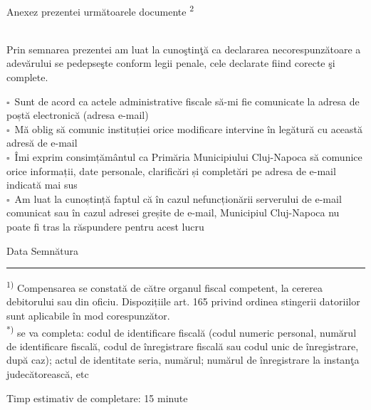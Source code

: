 \documentclass[11pt,a4paper]{article}
\newcommand{\fillline}[1][6cm]{\underline{\hspace{#1}}}
\newcommand{\checkboxempty}{$\square$}
\begin{document}
\hspace{0.5cm}Anexez prezentei următoarele documente \textsuperscript{2} \hrulefill\\
\hrulefill\\
\hrulefill

\vspace{0.3cm}

Prin semnarea prezentei am luat la cunoştinţă ca declararea necorespunzătoare a adevărului se pedepseşte conform legii penale, cele declarate fiind corecte şi complete.

\vspace{0.2cm}

\checkboxempty\ Sunt de acord ca actele administrative fiscale să-mi fie comunicate la adresa de poștă electronică (adresa e-mail)\\
\checkboxempty\ Mă oblig să comunic instituției orice modificare intervine în legătură cu această adresă de e-mail\\
\checkboxempty\ Îmi exprim consimțământul ca Primăria Municipiului Cluj-Napoca să comunice orice informații, date personale, clarificări și completări pe adresa de e-mail indicată mai sus\\
\checkboxempty\ Am luat la cunoștință faptul că în cazul nefuncționării serverului de e-mail comunicat sau în cazul adresei greșite de e-mail, Municipiul Cluj-Napoca nu poate fi tras la răspundere pentru acest lucru

\vspace{0.6cm}

Data \fillline[4cm] \hfill Semnătura \fillline[5cm]

\vspace{0.5cm}
\hrule
\vspace{0.2cm}

\footnotesize
\textsuperscript{1)} Compensarea se constată de către organul fiscal competent, la cererea debitorului sau din oficiu. Dispozițiile art. 165 privind ordinea stingerii datoriilor sunt aplicabile în mod corespunzător.\\
\textsuperscript{*)} se va completa: codul de identificare fiscală (codul numeric personal, numărul de identificare fiscală, codul de înregistrare fiscală sau codul unic de înregistrare, după caz); actul de identitate seria, numărul; numărul de înregistrare la instanţa judecătorească, etc

\vspace{0.3cm}

Timp estimativ de completare: 15 minute
\end{document}
